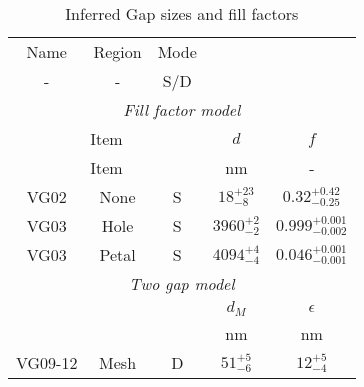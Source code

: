 \begin{table}[h!]
\caption{Inferred Gap sizes and fill factors \label{tbl_DerivedGapSizes}}
\begin{center}
    \begin{tabular}{ c c c c c }
    \hline
    Name & Region & Mode &  &  \\ 
    -  & - & S/D &  &  \\
    \hline
    \multicolumn{5}{c}{\emph{Fill factor model}} \\
    \hline
    \multicolumn{3}{c}{Item} & $d$ & $f$ \\
    \multicolumn{3}{c}{Item} & nm & - \\
    \cline{4-5}
    VG02 & None    &   S  & $18^{+23}_{-8}$ & $0.32^{+0.42}_{-0.25}$\\
    VG03 & Hole    &   S  & $3960^{+2}_{-2}$ &  $0.999^{+0.001}_{-0.002}$\\
    VG03 & Petal   &   S  & $4094^{+4}_{-4}$ &  $0.046^{+0.001}_{-0.001}$\\
    \hline
    \multicolumn{5}{c}{\emph{Two gap model}} \\
    \hline
    \multicolumn{3}{c}{} & $d_M$ & $\epsilon$ \\
    \multicolumn{3}{c}{} & nm    & nm \\
    \cline{4-5}
    VG09-12 & Mesh    &   D & $51^{+5}_{-6}  $ &  $12^{+5}_{-4}$\\
    \hline
    \end{tabular}
\end{center}
\end{table}